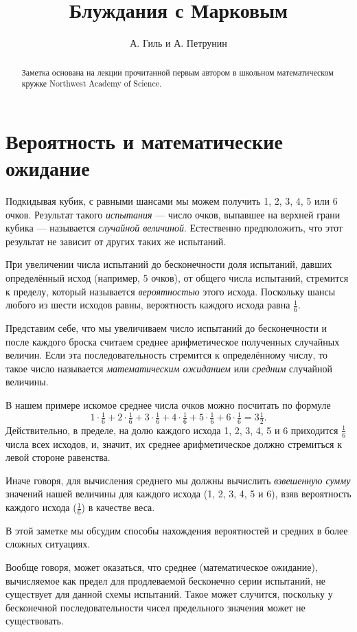 \documentclass{article}
\begin{document}
\title{Блуждания с Марковым}
\author{А. Гиль и А. Петрунин}
\date{}
\maketitle
\begin{abstract}
Заметка основана на лекции прочитанной первым автором в школьном 
математическом кружке Northwest Academy of Science.
\end{abstract}

\section{Вероятность и математические ожидание}

Подкидывая кубик,
с равными шансами мы можем получить 1, 2, 3, 4, 5 или 6 очков.
Результат такого \emph{испытания} --- число очков, выпавшее на 
верхней грани кубика --- называется \emph{случайной величиной}.
Естественно предположить, что этот результат не зависит от других таких же испытаний.

При увеличении числа испытаний до бесконечности 
доля испытаний, давших определённый исход (например, 5 очков), 
от общего числа испытаний, стремится к пределу, 
который называется \emph{вероятностью} этого исхода.
Поскольку шансы любого из шести исходов равны,
вероятность каждого исхода равна $\tfrac16$.

Представим себе, что мы увеличиваем число испытаний до бесконечности
и после каждого броска считаем среднее арифметическое полученных случайных величин.
Если эта последовательность стремится к определённому числу,
то такое число называется \emph{математическим ожиданием} или \emph{средним} случайной величины.

В нашем примере искомое среднее числа очков можно посчитать по формуле
\[1\cdot\tfrac16+2\cdot\tfrac16+3\cdot\tfrac16+4\cdot\tfrac16+5\cdot\tfrac16+6\cdot\tfrac16=3\tfrac12.\]
Действительно, в пределе, 
на долю каждого исхода 1, 2, 3, 4, 5 и 6
приходится $\tfrac16$ числа всех исходов, 
и, значит, их среднее арифметическое должно 
стремиться к левой стороне равенства.

Иначе говоря, для вычисления среднего мы должны вычислить \emph{взвешенную сумму} значений нашей величины для каждого исхода
(1, 2, 3, 4, 5 и 6), 
взяв вероятность каждого исхода ($\tfrac16$)
в качестве веса.

В этой заметке мы обсудим способы нахождения 
вероятностей и средних в более сложных ситуациях.

Вообще говоря, может оказаться, что среднее (математическое ожидание), вычисляемое как предел для продлеваемой бесконечно серии испытаний, не существует для данной схемы испытаний.
Такое может случится, поскольку у бесконечной последовательности чисел предельного значения может не существовать. 
\end{document}
